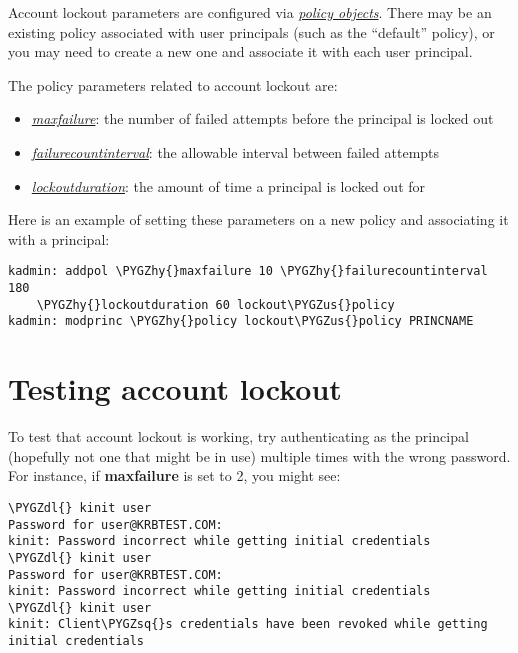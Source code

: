 \documentclass[letterpaper,10pt,english]{sphinxmanual}
\def\PYGZus{\char`\_}
\def\PYGZdl{\char`\$}
\def\PYGZhy{\char`\-}
\def\PYGZsq{\char`\'}
\begin{document}
Account lockout parameters are configured via {\hyperref[admin/database:policies]{\emph{policy objects}}}.  There may be an existing policy associated with user
principals (such as the ``default'' policy), or you may need to create a
new one and associate it with each user principal.

The policy parameters related to account lockout are:
\begin{itemize}
\item {} 
{\hyperref[admin/database:policy-maxfailure]{\emph{maxfailure}}}: the number of failed attempts
before the principal is locked out

\item {} 
{\hyperref[admin/database:policy-failurecountinterval]{\emph{failurecountinterval}}}: the
allowable interval between failed attempts

\item {} 
{\hyperref[admin/database:policy-lockoutduration]{\emph{lockoutduration}}}: the amount of time
a principal is locked out for

\end{itemize}

Here is an example of setting these parameters on a new policy and
associating it with a principal:

\begin{Verbatim}[commandchars=\\\{\}]
kadmin: addpol \PYGZhy{}maxfailure 10 \PYGZhy{}failurecountinterval 180
    \PYGZhy{}lockoutduration 60 lockout\PYGZus{}policy
kadmin: modprinc \PYGZhy{}policy lockout\PYGZus{}policy PRINCNAME
\end{Verbatim}


\section{Testing account lockout}
\label{admin/lockout:testing-account-lockout}
To test that account lockout is working, try authenticating as the
principal (hopefully not one that might be in use) multiple times with
the wrong password.  For instance, if \textbf{maxfailure} is set to 2, you
might see:

\begin{Verbatim}[commandchars=\\\{\}]
\PYGZdl{} kinit user
Password for user@KRBTEST.COM:
kinit: Password incorrect while getting initial credentials
\PYGZdl{} kinit user
Password for user@KRBTEST.COM:
kinit: Password incorrect while getting initial credentials
\PYGZdl{} kinit user
kinit: Client\PYGZsq{}s credentials have been revoked while getting initial credentials
\end{Verbatim}
\end{document}
